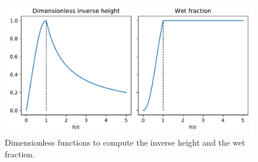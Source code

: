 \begin{figure}
    \centering
    \includegraphics[width=\textwidth]{img/eulerian/inverse_height.pdf}
    \caption{Dimensionless functions to compute the  inverse height and the wet fraction.}
    \label{inverse_heihgt}
\end{figure}





